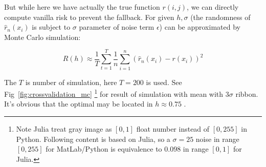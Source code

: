 \documentclass{article}
\begin{document}
But while here we have actually the true function $r(i,j)$, 
we can directly compute vanilla risk to prevent the fallback.
For given $h,\sigma$ (the randomness of $\hat{r}_n(x_i)$ is subject to $\sigma$ parameter of noise term $\epsilon$) 
can be approximated by Monte Carlo simulation:

$$
R(h) \approx \frac{1}{T} \sum_{t=1}^T \frac{1}{n}\sum_{i=1}^n(\hat{r}_n(x_i)-r(x_i))^2
$$

The $T$ is number of simulation, here $T=200$ is used. See Fig~\ref{fig:crossvalidation_mc}
\footnote{Note Julia treat gray image as $[0,1]$ float number instead of $[0,255]$ in Python. Following content is based on Julia,
so a $\sigma=25$ noise in range $[0,255]$ for MatLab/Python is equivalence to $0.098$ in range $[0,1]$ for Julia.}
 for result of simulation with mean with $3\sigma$ ribbon. 
It's obvious that the optimal may be located in $h \approx 0.75$ .
\end{document}
